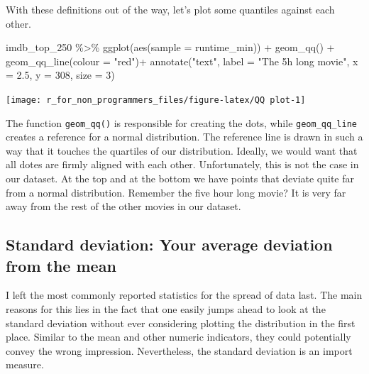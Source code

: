 \documentclass[
]{book}
\newenvironment{Shaded}{\begin{snugshade}}{\end{snugshade}}
\newcommand{\AttributeTok}[1]{\textcolor[rgb]{0.77,0.63,0.00}{#1}}
\newcommand{\DecValTok}[1]{\textcolor[rgb]{0.00,0.00,0.81}{#1}}
\newcommand{\FloatTok}[1]{\textcolor[rgb]{0.00,0.00,0.81}{#1}}
\newcommand{\FunctionTok}[1]{\textcolor[rgb]{0.00,0.00,0.00}{#1}}
\newcommand{\NormalTok}[1]{#1}
\newcommand{\SpecialCharTok}[1]{\textcolor[rgb]{0.00,0.00,0.00}{#1}}
\newcommand{\StringTok}[1]{\textcolor[rgb]{0.31,0.60,0.02}{#1}}
\begin{document}
With these definitions out of the way, let's plot some quantiles against each other.

\begin{Shaded}
\begin{Highlighting}[]
\NormalTok{imdb\_top\_250 }\SpecialCharTok{\%\textgreater{}\%}
  \FunctionTok{ggplot}\NormalTok{(}\FunctionTok{aes}\NormalTok{(}\AttributeTok{sample =}\NormalTok{ runtime\_min)) }\SpecialCharTok{+}
  \FunctionTok{geom\_qq}\NormalTok{() }\SpecialCharTok{+}
  \FunctionTok{geom\_qq\_line}\NormalTok{(}\AttributeTok{colour =} \StringTok{"red"}\NormalTok{)}\SpecialCharTok{+}
  \FunctionTok{annotate}\NormalTok{(}\StringTok{"text"}\NormalTok{,}
           \AttributeTok{label =} \StringTok{"The 5h long movie"}\NormalTok{,}
           \AttributeTok{x =} \FloatTok{2.5}\NormalTok{,}
           \AttributeTok{y =} \DecValTok{308}\NormalTok{,}
           \AttributeTok{size =} \DecValTok{3}\NormalTok{)}
\end{Highlighting}
\end{Shaded}

\begin{center}\texttt{[image: r\_for\_non\_programmers\_files/figure-latex/QQ plot-1]} \end{center}

The function \texttt{geom\_qq()} is responsible for creating the dots, while \texttt{geom\_qq\_line} creates a reference for a normal distribution. The reference line is drawn in such a way that it touches the quartiles of our distribution. Ideally, we would want that all dotes are firmly aligned with each other. Unfortunately, this is not the case in our dataset. At the top and at the bottom we have points that deviate quite far from a normal distribution. Remember the five hour long movie? It is very far away from the rest of the other movies in our dataset.

\hypertarget{standard-deviation}{%
\subsection{Standard deviation: Your average deviation from the mean}\label{standard-deviation}}

I left the most commonly reported statistics for the spread of data last. The main reasons for this lies in the fact that one easily jumps ahead to look at the standard deviation without ever considering plotting the distribution in the first place. Similar to the mean and other numeric indicators, they could potentially convey the wrong impression. Nevertheless, the standard deviation is an import measure.
\end{document}
